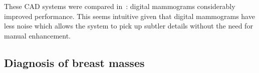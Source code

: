 These CAD systems were compared in~\cite{Ge2007}: digital mammograms considerably improved performance. This seems intuitive given that digital mammograms have less noise which allows the system to pick up subtler details without the need for manual enhancement.


\subsection{Diagnosis of breast masses}
\begin{comment}
- Unsupervised convolutional networks, trained as autoencoders with some slight variations. Uses SVM for classification.
- Not really a convnet
\end{comment}

\begin{comment}
- not published report
- DDSM database (8752 mammograms)
- only lesion treatment
- they do ~detection (masses vs calcifications) and diagnosis (benign vs malignant).
- two convnest fpr eachtask
- lesions were segmented from the images using the truth labels. 
- Each image is selected so that the shorter dimension is 64 (the other dimension will normally be larger), then 2 to 3 patches are sampled at random positions and each one is rotated 8 times.
- resulted in 50K lesion images
- negative and benign = benign, everything else= malignant
- tried different network sizes.
- accuracy 87%
\end{comment}
\begin{comment}
A recent unpublished report~\cite{Agarwal2015} uses a big convolutional network (8 layers, $\sim$3.6M parameters) with recent features to diagnose lesions as benign or malignant. Clustered microcalcifications and masses are segmented from 8752 mammograms obtained from a public database (DDSM). Two to three square images ($64 \times 64$) are randomly sampled from each lesion and each of these is rotated 8 times (at 45° steps) producing 50K image lesions in total. No further preprocessing is performed. The convolutional network obtains 69.8\% accuracy on the task. Other performance metrics are not provided. This is a project report for a course in Convolutional Networks~\cite{Karpathy2015} and may be incomplete or incorrect. We acknowledge it here for completeness.
\end{comment}


